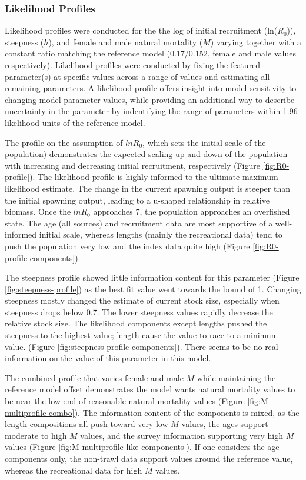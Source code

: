 \documentclass[11pt,
  letterpaper,
]{article}
\begin{document}
\hypertarget{likelihood-profiles}{%
\subsubsection{Likelihood Profiles}\label{likelihood-profiles}}

Likelihood profiles were conducted for the the log of initial recruitment (ln(\(R_0\))), steepness (\(h\)), and female and male natural mortality (\(M\)) varying together with a constant ratio matching the reference model (0.17/0.152, female and male values respectively). Likelihood profiles were conducted by fixing the featured parameter(s) at specific values across a range of values and estimating all remaining parameters. A likelihood profile offers insight into model sensitivity to changing model parameter values, while providing an additional way to describe uncertainty in the parameter by indentifying the range of parameters within 1.96 likelihood units of the reference model.

The profile on the assumption of \(lnR_0\), which sets the initial scale of the population) demonstrates the expected scaling up and down of the population with increasing and decreasing initial recruitment, respectively (Figure \ref{fig:R0-profile}). The likelihood profile is highly informed to the ultimate maximum likelihood estimate. The change in the current spawning output is steeper than the initial spawning output, leading to a u-shaped relationship in relative biomass. Once the \(lnR_0\) approaches 7, the population approaches an overfished state. The age (all sources) and recruitment data are most supportive of a well-informed initial scale, whereas lengths (mainly the recreational data) tend to push the population very low and the index data quite high (Figure \ref{fig:R0-profile-components}).

The steepness profile showed little information content for this parameter (Figure \ref{fig:steepness-profile}) as the best fit value went towards the bound of 1. Changing steepness mostly changed the estimate of current stock size, especially when steepness drops below 0.7. The lower steepness values rapidly decrease the relative stock size. The likelihood components except lengths pushed the steepness to the highest value; length cause the value to race to a minimum value. (Figure \ref{fig:steepness-profile-components}). There seems to be no real information on the value of this parameter in this model.

The combined profile that varies female and male \(M\) while maintaining the reference model offset demonstrates the model wants natural mortality values to be near the low end of reasonable natural mortality values (Figure \ref{fig:M-multiprofile-combo}). The information content of the components is mixed, as the length compositions all push toward very low \(M\) values, the ages support moderate to high \(M\) values, and the survey information supporting very high \(M\) values (Figure \ref{fig:M-multiprofile-like-components}). If one considers the age components only, the non-trawl data support values around the reference value, whereas the recreational data for high \(M\) values.
\end{document}
